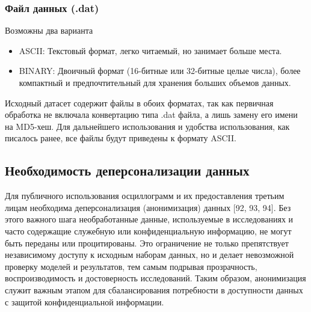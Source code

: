 
\subsubsection{Файл данных (.dat)}\label{sec:ch3_dat_file}

Возможны два варианта

\begin{itemize}[itemsep=2pt,topsep=2pt]
  \item ASCII: Текстовый формат, легко читаемый, но занимает больше места.
  \item BINARY: Двоичный формат (16-битные или 32-битные целые числа), более компактный и предпочтительный для хранения больших объемов данных.
\end{itemize}

Исходный датасет содержит файлы в обоих форматах, так как первичная обработка не включала конвертацию типа .dat файла, а лишь замену его имени на MD5-хеш. Для дальнейшего использования и удобства использования, как писалось ранее, все файлы будут приведены к формату ASCII.\par\vspace{0.2cm}

\subsection{Необходимость деперсонализации данных}\label{sec:ch3_depersonalization_necessity}

Для публичного использования осциллограмм и их предоставления третьим лицам необходима деперсонализация (анонимизация) данных [92, 93, 94]. Без этого важного шага необработанные данные, используемые в исследованиях и часто содержащие служебную или конфиденциальную информацию, не могут быть переданы или процитированы. Это ограничение не только препятствует независимому доступу к исходным наборам данных, но и делает невозможной проверку моделей и результатов, тем самым подрывая прозрачность, воспроизводимость и достоверность исследований. Таким образом, анонимизация служит важным этапом для сбалансирования потребности в доступности данных с защитой конфиденциальной информации.\par\vspace{0.2cm}

